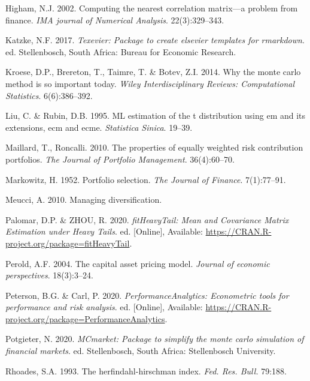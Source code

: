 \documentclass[11pt,preprint, authoryear]{elsarticle}
\numberwithin{equation}{section}
\numberwithin{figure}{section}
\numberwithin{table}{section}
\begin{document}
\leavevmode\hypertarget{ref-higham2002}{}%
Higham, N.J. 2002. Computing the nearest correlation matrix---a problem
from finance. \emph{IMA journal of Numerical Analysis}. 22(3):329--343.

\leavevmode\hypertarget{ref-Texevier}{}%
Katzke, N.F. 2017. \emph{Texevier: Package to create elsevier templates
for rmarkdown}. ed. Stellenbosch, South Africa: Bureau for Economic
Research.

\leavevmode\hypertarget{ref-kroese2014}{}%
Kroese, D.P., Brereton, T., Taimre, T. \& Botev, Z.I. 2014. Why the
monte carlo method is so important today. \emph{Wiley Interdisciplinary
Reviews: Computational Statistics}. 6(6):386--392.

\leavevmode\hypertarget{ref-liu1995}{}%
Liu, C. \& Rubin, D.B. 1995. ML estimation of the t distribution using
em and its extensions, ecm and ecme. \emph{Statistica Sinica}. 19--39.

\leavevmode\hypertarget{ref-maillard2010}{}%
Maillard, T., Roncalli. 2010. The properties of equally weighted risk
contribution portfolios. \emph{The Journal of Portfolio Management}.
36(4):60--70.

\leavevmode\hypertarget{ref-markowitz}{}%
Markowitz, H. 1952. Portfolio selection. \emph{The Journal of Finance}.
7(1):77--91.

\leavevmode\hypertarget{ref-meucci2010}{}%
Meucci, A. 2010. Managing diversification.

\leavevmode\hypertarget{ref-fitHeavyTail}{}%
Palomar, D.P. \& ZHOU, R. 2020. \emph{fitHeavyTail: Mean and Covariance
Matrix Estimation under Heavy Tails}. ed. {[}Online{]}, Available:
\url{https://CRAN.R-project.org/package=fitHeavyTail}.

\leavevmode\hypertarget{ref-perold2004}{}%
Perold, A.F. 2004. The capital asset pricing model. \emph{Journal of
economic perspectives}. 18(3):3--24.

\leavevmode\hypertarget{ref-PerformanceAnalytics}{}%
Peterson, B.G. \& Carl, P. 2020. \emph{PerformanceAnalytics: Econometric
tools for performance and risk analysis}. ed. {[}Online{]}, Available:
\url{https://CRAN.R-project.org/package=PerformanceAnalytics}.

\leavevmode\hypertarget{ref-MCmarket}{}%
Potgieter, N. 2020. \emph{MCmarket: Package to simplify the monte carlo
simulation of financial markets}. ed. Stellenbosch, South Africa:
Stellenbosch University.

\leavevmode\hypertarget{ref-rhoades1993}{}%
Rhoades, S.A. 1993. The herfindahl-hirschman index. \emph{Fed. Res.
Bull.} 79:188.
\end{document}
